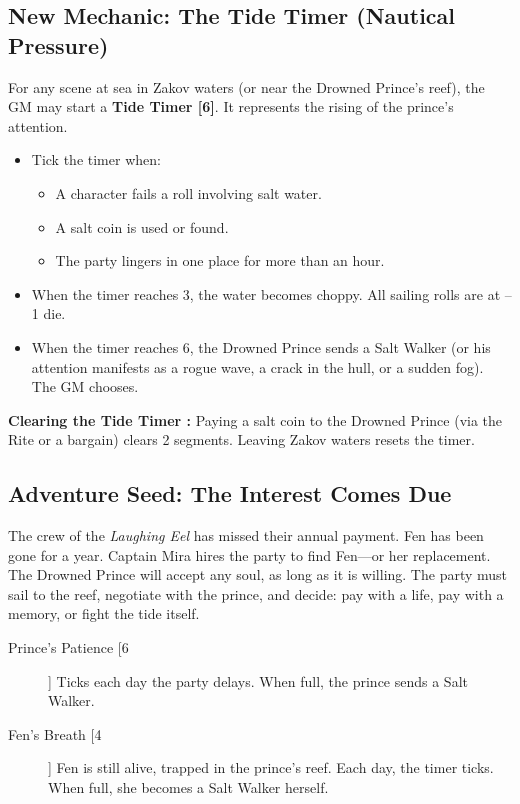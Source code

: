 \documentclass[12pt]{article}
\begin{document}
\subsection{New Mechanic: The Tide Timer (Nautical Pressure)}
For any scene at sea in Zakov waters (or near the Drowned Prince's reef), the GM may start a \textbf{Tide Timer [6]}. It represents the rising of the prince's attention.

\begin{itemize}
  \item Tick the timer when:
    \begin{itemize}
      \item A character fails a roll involving salt water.
      \item A salt coin is used or found.
      \item The party lingers in one place for more than an hour.
    \end{itemize}
  \item When the timer reaches 3, the water becomes choppy. All sailing rolls are at --1 die.
  \item When the timer reaches 6, the Drowned Prince sends a Salt Walker (or his attention manifests as a rogue wave, a crack in the hull, or a sudden fog). The GM chooses.
\end{itemize}

\textbf{Clearing the Tide Timer :} Paying a salt coin to the Drowned Prince (via the Rite or a bargain) clears 2 segments. Leaving Zakov waters resets the timer.

\subsection{Adventure Seed: The Interest Comes Due}
The crew of the \textit{Laughing Eel} has missed their annual payment. Fen has been gone for a year. Captain Mira hires the party to find Fen---or her replacement. The Drowned Prince will accept any soul, as long as it is willing. The party must sail to the reef, negotiate with the prince, and decide: pay with a life, pay with a memory, or fight the tide itself.

\begin{description}
  \item[Prince's Patience [6]] Ticks each day the party delays. When full, the prince sends a Salt Walker.
  \item[Fen's Breath [4]] Fen is still alive, trapped in the prince's reef. Each day, the timer ticks. When full, she becomes a Salt Walker herself.
\end{description}
\end{document}
